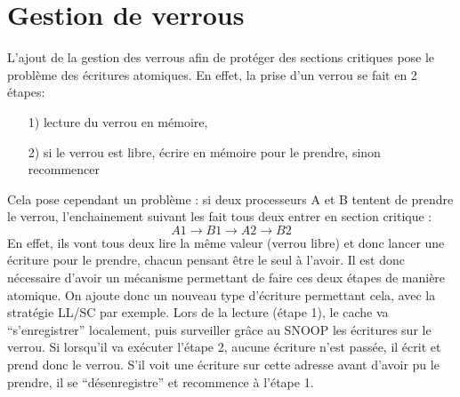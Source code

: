 \documentclass[a4paper, 11pt]{article}
\begin{document}
\section{Gestion de verrous}
L'ajout de la gestion des verrous afin de protéger des sections critiques
pose le problème des écritures atomiques. En effet, la prise d'un verrou se fait
en 2 étapes:
\begin{itemize}
  \item[1)] lecture du verrou en mémoire,
  \item[2)] si le verrou est libre, écrire en mémoire pour le prendre, sinon 
    recommencer
\end{itemize}
Cela pose cependant un problème : si deux processeurs A et B tentent de prendre
le verrou, l'enchainement suivant les fait tous deux entrer en section 
critique :
\[
A1 \rightarrow B1 \rightarrow A2 \rightarrow B2
\] 
En effet, ils vont tous deux lire la même valeur (verrou libre) et donc lancer
une écriture pour le prendre, chacun pensant être le seul à l'avoir. Il est
donc nécessaire d'avoir un mécanisme permettant de faire ces deux étapes de
manière atomique. On ajoute donc un nouveau type d'écriture permettant cela,
avec la stratégie LL/SC par exemple. Lors de la lecture (étape 1), le cache
va ``s'enregistrer'' localement, puis surveiller grâce au SNOOP les écritures
sur le verrou. Si lorsqu'il va exécuter l'étape 2, aucune écriture n'est passée,
il écrit et prend donc le verrou. S'il voit une écriture sur cette adresse avant
d'avoir pu le prendre, il se ``désenregistre'' et recommence à l'étape 1.
\end{document}
